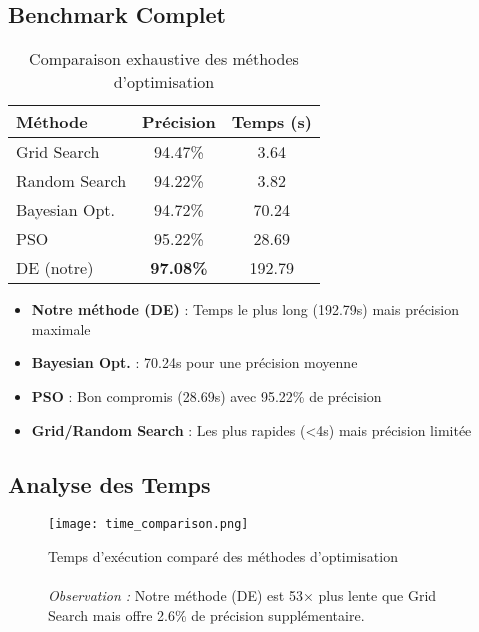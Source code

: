 \documentclass[a4paper, 12pt]{article}
\begin{document}
\subsection{Benchmark Complet}
\begin{table}[H]
\centering
\begin{tabular}{@{}lcc@{}}
\toprule
\textbf{Méthode} & \textbf{Précision} & \textbf{Temps (s)} \\
\midrule
Grid Search & 94.47\% & 3.64 \\
Random Search & 94.22\% & 3.82 \\
Bayesian Opt. & 94.72\% & 70.24 \\
PSO & 95.22\% & 28.69 \\
\rowcolor
DE (notre) & \textbf{97.08\%} & 192.79 \\
\bottomrule
\end{tabular}
\caption{Comparaison exhaustive des méthodes d'optimisation}
\label{tab:benchmark}
\end{table}

\begin{itemize}
\item \textbf{Notre méthode (DE)} : Temps le plus long (192.79s) mais précision maximale
\item \textbf{Bayesian Opt.} : 70.24s pour une précision moyenne
\item \textbf{PSO} : Bon compromis (28.69s) avec 95.22\% de précision
\item \textbf{Grid/Random Search} : Les plus rapides (<4s) mais précision limitée
\end{itemize}
\subsection{Analyse des Temps}
\begin{figure}[H]
\centering
\texttt{[image: time\_comparison.png]}
\caption{Temps d'exécution comparé des méthodes d'optimisation\\
\\\textit{Observation :} Notre méthode (DE) est 53× plus lente que Grid Search mais offre 2.6\% de précision supplémentaire.}
\label{fig:time_comp}
\end{figure}
\end{document}
